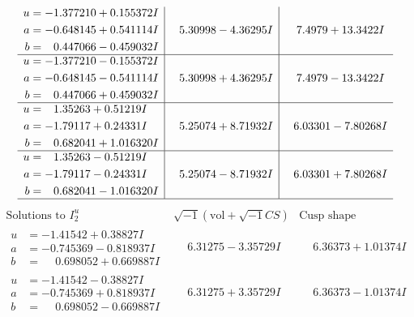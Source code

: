 \documentclass[1p]{elsarticle_modified}
\theoremstyle{definition}
\newcommand{\I}{\sqrt{-1}}
\begin{document}
$$\begin{array}{c|c|c}
\begin{aligned}
u &= -1.377210 + 0.155372 I \\
a &= -0.648145 + 0.541114 I \\
b &= \phantom{-}0.447066 - 0.459032 I\end{aligned}
 & \phantom{-}5.30998 - 4.36295 I & \phantom{-}7.4979 + 13.3422 I \\ \hline\begin{aligned}
u &= -1.377210 - 0.155372 I \\
a &= -0.648145 - 0.541114 I \\
b &= \phantom{-}0.447066 + 0.459032 I\end{aligned}
 & \phantom{-}5.30998 + 4.36295 I & \phantom{-}7.4979 - 13.3422 I \\ \hline\begin{aligned}
u &= \phantom{-}1.35263 + 0.51219 I \\
a &= -1.79117 + 0.24331 I \\
b &= \phantom{-}0.682041 + 1.016320 I\end{aligned}
 & \phantom{-}5.25074 + 8.71932 I & \phantom{-}6.03301 - 7.80268 I \\ \hline\begin{aligned}
u &= \phantom{-}1.35263 - 0.51219 I \\
a &= -1.79117 - 0.24331 I \\
b &= \phantom{-}0.682041 - 1.016320 I\end{aligned}
 & \phantom{-}5.25074 - 8.71932 I & \phantom{-}6.03301 + 7.80268 I\\
 \hline 
 \end{array}$$\newpage$$\begin{array}{c|c|c}  
\text{Solutions to }I^u_{2}& \I (\text{vol} + \sqrt{-1}CS) & \text{Cusp shape}\\
 \hline 
\begin{aligned}
u &= -1.41542 + 0.38827 I \\
a &= -0.745369 - 0.818937 I \\
b &= \phantom{-}0.698052 + 0.669887 I\end{aligned}
 & \phantom{-}6.31275 - 3.35729 I & \phantom{-}6.36373 + 1.01374 I \\ \hline\begin{aligned}
u &= -1.41542 - 0.38827 I \\
a &= -0.745369 + 0.818937 I \\
b &= \phantom{-}0.698052 - 0.669887 I\end{aligned}
 & \phantom{-}6.31275 + 3.35729 I & \phantom{-}6.36373 - 1.01374 I \\ \hline\begin{aligned}

\end{aligned}
\end{array}$$
\end{document}
